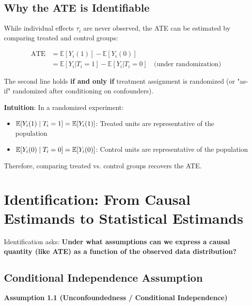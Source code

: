 \subsection{Why the ATE is
Identifiable}\label{_why_the_ate_is_identifiable}

While individual effects \(\tau_i\) are never observed, the ATE can be
estimated by comparing treated and control groups:

\begin{align}
\text{ATE} &= \mathbb{E}[Y_i(1)] - \mathbb{E}[Y_i(0)] \\
&= \mathbb{E}[Y_i | T_i = 1] - \mathbb{E}[Y_i | T_i = 0] \quad \text{(under randomization)}
\end{align}

The second line holds \textbf{if and only if} treatment assignment is
randomized (or "as-if" randomized after conditioning on confounders).

\textbf{Intuition}: In a randomized experiment:
\begin{itemize}
\item $\mathbb{E}[Y_i(1) \mid T_i = 1] = \mathbb{E}[Y_i(1)]$: Treated units are representative of the population
\item $\mathbb{E}[Y_i(0) \mid T_i = 0] = \mathbb{E}[Y_i(0)]$: Control units are representative of the population
\end{itemize}

Therefore, comparing treated vs. control groups recovers the ATE.

\section{Identification: From Causal Estimands to Statistical
Estimands}\label{_identification_from_causal_estimands_to_statistical_estimands}

Identification asks: \textbf{Under what assumptions can we express a
causal quantity (like ATE) as a function of the observed data
distribution?}

\subsection{Conditional Independence
Assumption}\label{_conditional_independence_assumption}

%
\textbf{Assumption 1.1 (Unconfoundedness / Conditional Independence)}


